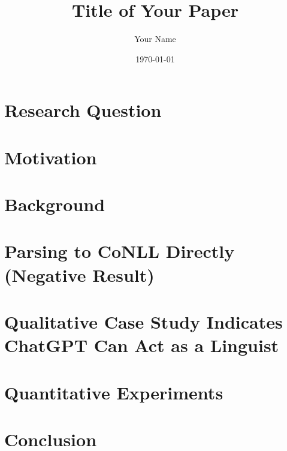 \documentclass[11pt]{article}
\title{Title of Your Paper}
\author{Your Name}
\date{\today}
\begin{document}
\maketitle



\section{Research Question}


\section{Motivation}


\section{Background}


\section{Parsing to CoNLL Directly (Negative Result)}


\section{Qualitative Case Study Indicates ChatGPT Can Act as a Linguist}


\section{Quantitative Experiments}


\section{Conclusion}




\end{document}
